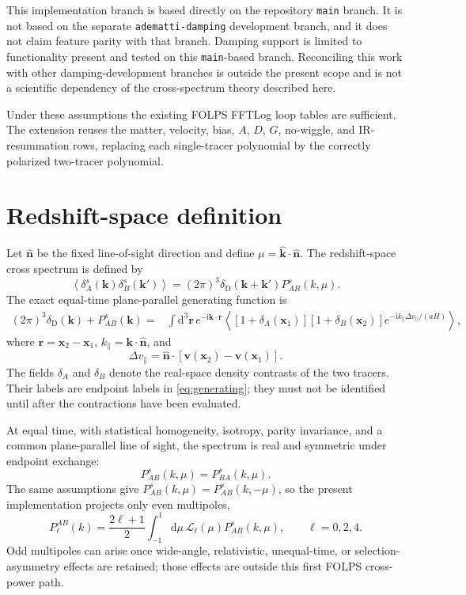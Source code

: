\documentclass[11pt]{article}
\newcommand{\dd}{\mathrm{d}}
\newcommand{\ii}{\mathrm{i}}
\newcommand{\bk}{\bm{k}}
\newcommand{\br}{\bm{r}}
\newcommand{\bx}{\bm{x}}
\newcommand{\bn}{\hat{\bm{n}}}
\newcommand{\PD}{\delta_{\mathrm D}}
\begin{document}
This implementation branch is based directly on the repository \texttt{main}
branch.  It is not based on the separate \texttt{adematti-damping}
development branch, and it does not claim feature parity with that branch.
Damping support is limited to functionality present and tested on this
\texttt{main}-based branch.  Reconciling this work with other
damping-development branches is outside the present scope and is not a
scientific dependency of the cross-spectrum theory described here.

Under these assumptions the existing FOLPS FFTLog loop tables are sufficient.
The extension reuses the matter, velocity, bias, $A$, $D$, $G$, no-wiggle, and
IR-resummation rows, replacing each single-tracer polynomial by the correctly
polarized two-tracer polynomial.

\section{Redshift-space definition}

Let $\bn$ be the fixed line-of-sight direction and define
$\mu=\hat{\bk}\cdot\bn$.  The redshift-space cross spectrum is defined by
\begin{equation}
  \left\langle
    \delta_A^s(\bk)\delta_B^s(\bk')
  \right\rangle
  =
  (2\pi)^3\PD(\bk+\bk')P^s_{AB}(k,\mu).
\end{equation}
The exact equal-time plane-parallel generating function is
\begin{align}
  (2\pi)^3\PD(\bk)+P^s_{AB}(\bk)
  ={}&
  \int \dd^3\br\,e^{-\ii\bk\cdot\br}
  \left\langle
  [1+\delta_A(\bx_1)]
  [1+\delta_B(\bx_2)]
  e^{-\ii k_\parallel\Delta v_\parallel/(aH)}
  \right\rangle ,
  \label{eq:generating}
\end{align}
where $\br=\bx_2-\bx_1$,
$k_\parallel=\bk\cdot\bn$, and
\begin{equation}
  \Delta v_\parallel=
  \bn\cdot[\bm{v}(\bx_2)-\bm{v}(\bx_1)] .
\end{equation}
The fields $\delta_A$ and $\delta_B$ denote the real-space density contrasts of
the two tracers.  Their labels are endpoint labels in
\eqref{eq:generating}; they must not be identified until after the
contractions have been evaluated.

At equal time, with statistical homogeneity, isotropy, parity invariance, and a
common plane-parallel line of sight, the spectrum is real and symmetric under
endpoint exchange:
\begin{equation}
  P^s_{AB}(k,\mu)=P^s_{BA}(k,\mu).
  \label{eq:exchange}
\end{equation}
The same assumptions give $P^s_{AB}(k,\mu)=P^s_{AB}(k,-\mu)$, so the present
implementation projects only even multipoles,
\begin{equation}
  P^{AB}_\ell(k)=
  \frac{2\ell+1}{2}\int_{-1}^{1}\dd\mu\,
  \mathcal{L}_\ell(\mu)P^s_{AB}(k,\mu),
  \qquad \ell=0,2,4.
\end{equation}
Odd multipoles can arise once wide-angle, relativistic, unequal-time, or
selection-asymmetry effects are retained; those effects are outside this first
FOLPS cross-power path.
\end{document}
